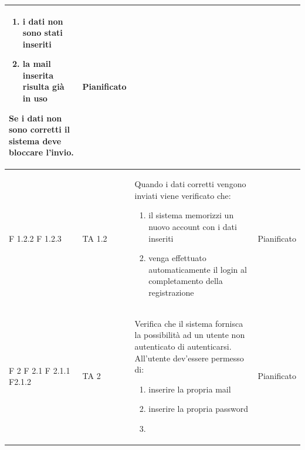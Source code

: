 \documentclass[a4paper,11pt]{article}
\begin{document}
\begin{longtable}{p{}p{}p{}p{}}
\begin{enumerate}
\item i dati non sono stati inseriti
\item la mail inserita risulta già in uso
\end{enumerate}
Se i dati non sono corretti il sistema deve bloccare l'invio. & Pianificato\\
\midrule

F 1.2.2 \newline F 1.2.3 & TA 1.2 & Quando i dati corretti vengono inviati viene verificato che:
\begin{enumerate}
\item il sistema memorizzi un nuovo account con i dati inseriti
\item venga effettuato automaticamente il login al completamento della registrazione
\end{enumerate}   & Pianificato\\

\midrule
F 2 \newline F 2.1 \newline F 2.1.1 \newline F2.1.2  & TA 2& Verifica che il sistema fornisca la possibilità ad un utente non autenticato di autenticarsi. All'utente dev'essere permesso di: 
\begin{enumerate}
\item inserire la propria mail
\item inserire la propria password
\item
\end{enumerate} & Pianificato\\


\end{longtable}
\end{document}
